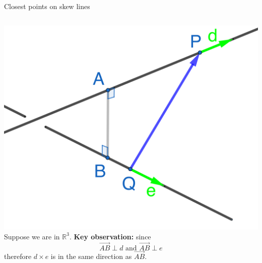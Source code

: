 \documentclass{beamer}
\begin{document}
\begin{frame}{Closest points on skew lines}
\begin{columns}
    \hspace{-1cm}
    \includegraphics[scale=0.3]{skew-distance1.png}
    Suppose we are in $\mathbb{R}^3$.\vfill
    {\bf Key observation:} since
    \begin{equation*}
    \overrightarrow {AB} \perp d\text{ and } \overrightarrow {AB} \perp e
    \end{equation*}
    therefore $d\times e$ is in the same direction as $\overrightarrow{AB}$.
\end{columns}
\end{frame}
\end{document}
